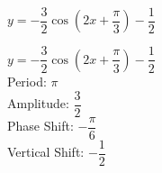 {$y = -\dfrac{3}{2} \cos \left( 2x + \dfrac{\pi}{3} \right) - \dfrac{1}{2}$}
{$y = -\dfrac{3}{2} \cos \left( 2x + \dfrac{\pi}{3} \right) - \dfrac{1}{2}$\\
Period: $\pi$\\
Amplitude: $\dfrac{3}{2}$\\
Phase Shift: $-\dfrac{\pi}{6}$\\
Vertical Shift: $-\dfrac{1}{2}$

\begin{center}
\end{center}
}
